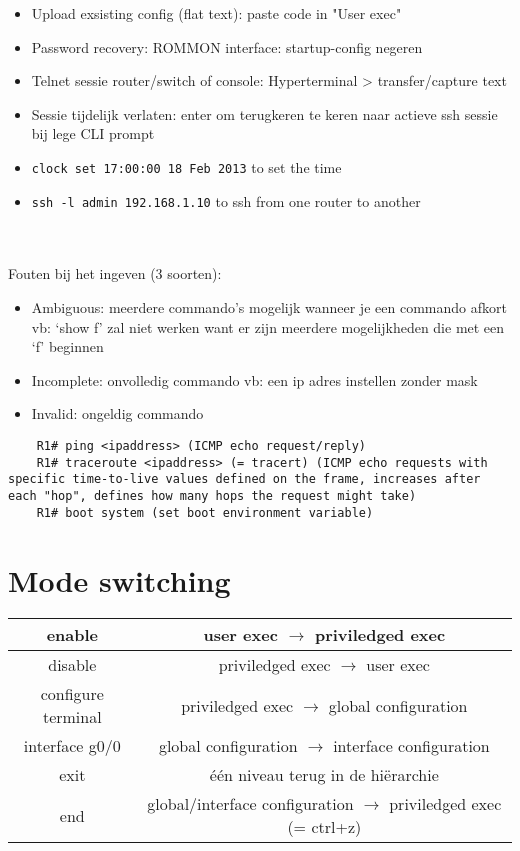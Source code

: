 \documentclass[10pt, a4paper]{article}
\begin{document}
	\begin{itemize}[noitemsep,nolistsep]
		\item Upload exsisting config (flat text): paste code in "User exec"
		\item Password recovery: ROMMON interface: startup-config negeren
		\item Telnet sessie router/switch of console: Hyperterminal > transfer/capture text
		\item Sessie tijdelijk verlaten: enter om terugkeren te keren naar actieve ssh sessie bij lege CLI prompt
		\item \texttt{clock set 17:00:00 18 Feb 2013} to set the time
		\item \texttt{ssh -l admin 192.168.1.10} to ssh from one router to another\\
	\end{itemize}
	\ \\ \\

	Fouten bij het ingeven (3 soorten):
	\begin{itemize}[noitemsep,nolistsep]
		\item Ambiguous: meerdere commando’s mogelijk wanneer je een commando afkort vb: ‘show f’ zal niet werken want er zijn meerdere mogelijkheden die met een ‘f’ beginnen
		\item Incomplete: onvolledig commando vb: een ip adres instellen zonder mask
		\item Invalid: ongeldig commando\\
	\end{itemize}

	\begin{lstlisting}
	R1# ping <ipaddress> (ICMP echo request/reply)
	R1# traceroute <ipaddress> (= tracert) (ICMP echo requests with specific time-to-live values defined on the frame, increases after each "hop", defines how many hops the request might take)
	R1# boot system (set boot environment variable)
	\end{lstlisting}

	\section{Mode switching}
	\begin{tabular}{|c|c|}
		\hline \rule[-1ex]{0pt}{4ex} enable & user exec $\rightarrow$ priviledged exec  \\
		\hline \rule[-1ex]{0pt}{4ex} disable  & priviledged exec $\rightarrow$ user exec \\
		\hline \rule[-1ex]{0pt}{4ex} configure terminal & priviledged exec $\rightarrow$ global configuration \\
		\hline \rule[-1ex]{0pt}{4ex} interface g0/0 & global configuration $\rightarrow$ interface configuration \\
		\hline \rule[-1ex]{0pt}{4ex} exit & \'{e}\'{e}n niveau terug in de hiërarchie\\
		\hline \rule[-1ex]{0pt}{4ex} end & global/interface configuration $\rightarrow$ priviledged exec (= ctrl+z)  \\
		\hline
	\end{tabular} \\
\end{document}

